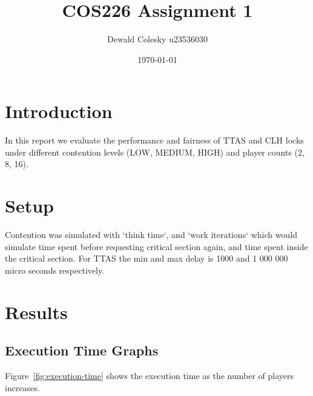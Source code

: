 \documentclass[12pt,a4paper]{article}
\title{COS226 Assignment 1}
\author{Dewald Colesky u23536030}
\date{\today}
\begin{document}
\maketitle

\section{Introduction}
In this report we evaluate the performance and fairness of TTAS and CLH locks under different contention levels (LOW, MEDIUM, HIGH) and player counts (2, 8, 16).

\section{Setup}
Contention was simulated with `think time`, and `work iterations` which would simulate time spent before requesting critical section again, and time spent inside the critical section. For TTAS the min and max delay is 1000 and 1 000 000 micro seconds respectively.

\clearpage
\section{Results}


\subsection{Execution Time Graphs}
Figure~\ref{fig:execution-time} shows the execution time as the number of players increases.
\end{document}
